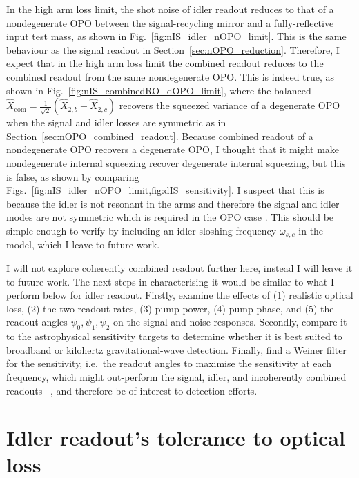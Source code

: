 In the high arm loss limit, the shot noise of idler readout reduces to that of a nondegenerate OPO between the signal-recycling mirror and a fully-reflective input test mass, as shown in Fig.~\ref{fig:nIS_idler_nOPO_limit}. This is the same behaviour as the signal readout in Section~\ref{sec:nOPO_reduction}.
Therefore, I expect that in the high arm loss limit the combined readout reduces to the combined readout from the same nondegenerate OPO. This is indeed true, as shown in Fig.~\ref{fig:nIS_combinedRO_dOPO_limit}, where the balanced $\hat X_\text{com}=\frac{1}{\sqrt2}\left(\hat X_{2,b}+\hat X_{2,c}\right)$  recovers the squeezed variance of a degenerate OPO when the signal and idler losses are symmetric  as in Section~\ref{sec:nOPO_combined_readout}.
Because combined readout of a nondegenerate OPO recovers a degenerate OPO, I thought that it might make nondegenerate internal squeezing recover degenerate internal squeezing, but this is false, as shown by comparing Figs.~\ref{fig:nIS_idler_nOPO_limit,fig:dIS_sensitivity}. I suspect that this is because the idler is not resonant in the arms and therefore the signal and idler modes are not symmetric which is required in the OPO case . This should be simple enough to verify by including an idler sloshing frequency $\omega_{s,c}$ in the model, which I leave to future work.

I will not explore coherently combined readout further here, instead I will leave it to future work. The next steps in characterising it would be similar to what I perform below for idler readout. Firstly, examine the effects of (1) realistic optical loss, (2) the two readout rates, (3) pump power, (4) pump phase, and (5) the readout angles $\psi_0,\psi_1,\psi_2$ on the signal and noise responses. %
Secondly, compare it to the astrophysical sensitivity targets to determine whether it is best suited to broadband or kilohertz gravitational-wave detection. Finally, find a Weiner filter for the sensitivity, i.e.\ the readout angles to maximise the sensitivity at each frequency, which might out-perform the signal, idler, and incoherently combined readouts ~\cite{}, and therefore be of interest to detection efforts.


\section{Idler readout's tolerance to optical loss}

